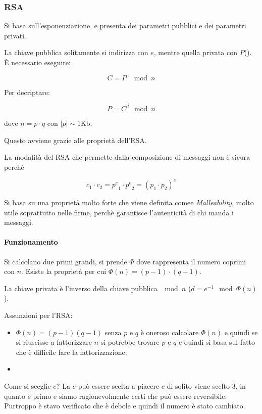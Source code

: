\subsubsection{RSA}

Si basa sull'esponenziazione, e presenta dei parametri pubblici e dei parametri
privati.


La chiave pubblica solitamente si indirizza con $e$, mentre quella privata con
$P$(). È necessario eseguire:

\[ C = P^e \mod n \]

Per decriptare:

\[ P = C^d \mod n \]

dove $n = p \cdot q$ con $|p| \sim 1$Kb.

Questo avviene grazie alle proprietà dell'RSA.

La modalità del RSA che permette dalla composizione di messaggi non è sicura
perché

\[ c_1 \cdot c_2 = {p^e}_1 \cdot {p^e}_2 = (p_1 \cdot p_2)^e\]


Si basa su una proprietà molto forte che viene definita comee
\textit{Malleability}, molto utile soprattutto nelle firme, perchè garantisce
l'autenticità di chi manda i messaggi.


\paragraph{Funzionamento}

Si calcolano due primi grandi, si prende $\Phi$ dove rappresenta il numero
coprimi con $n$.
Esiste la proprietà per cui $\Phi(n) = (p-1) \cdot (q-1)$.

La chiave privata è l'inverso della chiave pubblica $\mod n$ ($d = e^{-1}
\mod \Phi(n)$).

Assunzioni per l'RSA:
\begin{itemize}
	\item {} $\Phi(n) = (p-1)(q-1)$ senza $p$ e $q$ è
oneroso calcolare $\Phi(n)$ e quindi se si riuscisse a fattorizzare $n$ si
potrebbe trovare $p$ e $q$ e quindi si basa sul fatto che è difficile fare la
fattorizzazione.
    \item {}
\end{itemize}


Come si sceglie $e$? La $e$ può essere scelta a piacere e di solito viene scelto
$3$, in quanto è primo e siamo ragionevolmente certi che può essere reversibile.
Purtroppo è stavo verificato che è debole e quindi il numero è stato cambiato.

